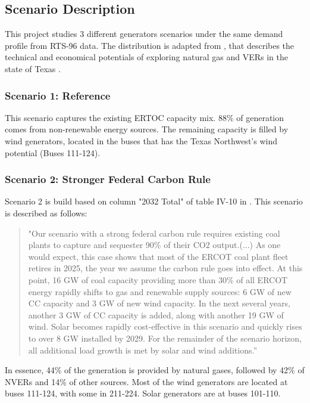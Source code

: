 \documentclass[12pt,LUDisStyle,twosided]{book}
\begin{document}
\subsection{Scenario Description}

This project studies 3 different generators scenarios under the same demand profile from RTS-96 data. The distribution is adapted from \citeauthor{shavel}, that describes the technical and economical potentials of exploring natural gas and VERs in the state of Texas \cite{shavel}. 

\subsubsection{Scenario 1: Reference}

This scenario captures the existing ERTOC capacity mix. 88\% of generation comes from non-renewable energy sources. The remaining capacity is filled by wind generators, located in the buses that has the Texas Northwest's wind potential (Buses 111-124).

\subsubsection{Scenario 2: Stronger Federal Carbon Rule}

Scenario 2 is build based on column "2032 Total" of table IV-10 in \cite{shavel}. This scenario is described as follows:

\begin{quotation}
"Our scenario with a strong federal carbon rule requires existing coal plants to capture and sequester 90\% of their CO2 output.(...)
As one would expect, this case shows that most of the ERCOT coal plant fleet retires in 2025, the year we assume the carbon rule goes into effect. At this point, 16 GW of coal capacity providing more than 30\% of all ERCOT energy rapidly shifts to gas and renewable supply sources: 6 GW of new CC capacity and 3 GW of new wind capacity. In the next several years, another 3 GW of CC capacity is added, along with another 19 GW of wind. Solar becomes rapidly cost-effective in this scenario and quickly rises to over 8 GW installed by 2029. For the remainder of the scenario horizon, all additional load growth is met by solar and wind additions.”
\end{quotation}

In essence, 44\% of the generation is provided by natural gases, followed by 42\% of NVERs and 14\% of other sources. Most of the wind generators are located at buses 111-124, with some in 211-224. Solar generators are at buses 101-110.
\end{document}
